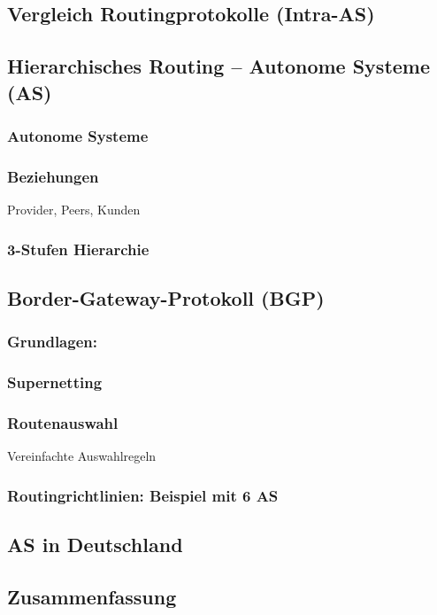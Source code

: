 \subsection{Vergleich Routingprotokolle (Intra-AS)}

\subsection{Hierarchisches Routing -- Autonome Systeme (AS)}
\subsubsection*{Autonome Systeme}

\subsubsection{Beziehungen}
Provider, Peers, Kunden
\subsubsection{3-Stufen Hierarchie}

\subsection{Border-Gateway-Protokoll (BGP)}
\subsubsection{Grundlagen:}
\subsubsection{Supernetting}
\subsubsection{Routenauswahl}
Vereinfachte Auswahlregeln
\subsubsection{Routingrichtlinien: Beispiel mit 6 AS}

\subsection{AS in Deutschland}

\subsection{Zusammenfassung}

